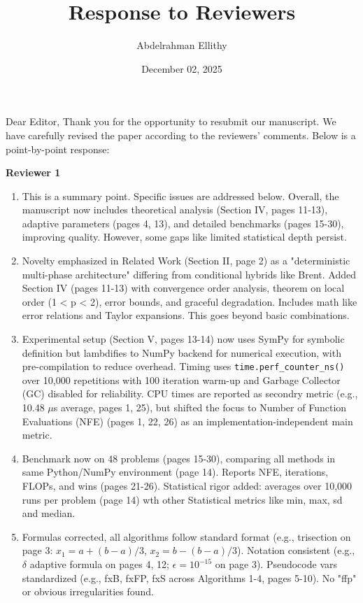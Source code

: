 \documentclass{article}
\begin{document}
\title{Response to Reviewers}
\author{Abdelrahman Ellithy}
\date{December 02, 2025}
\maketitle
Dear Editor,
Thank you for the opportunity to resubmit our manuscript. We have carefully revised the paper according to the reviewers’ comments. Below is a point-by-point response:

\textbf{Reviewer 1}
\begin{enumerate}
\item This is a summary point. Specific issues are addressed below. Overall, the manuscript now includes theoretical analysis (Section IV, pages 11-13), adaptive parameters (pages 4, 13), and detailed benchmarks (pages 15-30), improving quality. However, some gaps like limited statistical depth persist.
\item Novelty emphasized in Related Work (Section II, page 2) as a "deterministic multi-phase architecture" differing from conditional hybrids like Brent. Added Section IV (pages 11-13) with convergence order analysis, theorem on local order (1 < p < 2), error bounds, and graceful degradation. Includes math like error relations and Taylor expansions. This goes beyond basic combinations.
\item Experimental setup (Section V, pages 13-14) now uses SymPy for symbolic definition but lambdifies to NumPy backend for numerical execution, with pre-compilation to reduce overhead. Timing uses \texttt{time.perf\_counter\_ns()} over 10,000 repetitions with 100 iteration warm-up and Garbage Collector (GC) disabled for reliability. CPU times are reported as secondry metric (e.g., 10.48 $\mu$s average, pages 1, 25), but shifted the focus to Number of Function Evaluations (NFE) (pages 1, 22, 26) as an implementation-independent main metric.
\item Benchmark now on 48 problems (pages 15-30), comparing all methods in same Python/NumPy environment (page 14). Reports NFE, iterations, FLOPs, and wins (pages 21-26). Statistical rigor added: averages over 10,000 runs per problem (page 14) wth other Statistical metrics like min, max, sd and median.
\item Formulas corrected, all algorithms follow standard format (e.g., trisection on page 3: $x_1 = a + (b-a)/3$, $x_2 = b - (b-a)/3$). Notation consistent (e.g., $\delta$ adaptive formula on pages 4, 12; $\epsilon=10^{-15}$ on page 3). Pseudocode vars standardized (e.g., fxB, fxFP, fxS across Algorithms 1-4, pages 5-10). No "ffp" or obvious irregularities found.

\end{enumerate}
\end{document}
